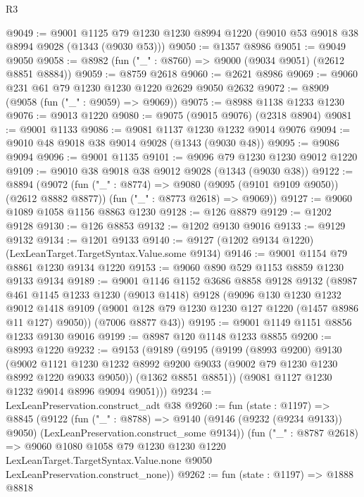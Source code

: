 \begin{lexlean}{R3}
\begin{coremodule}
@9049 := @9001
    @1125
    @79
    @1230
    @1230
    @8994
    @1220
    (@9010 @53 @9018 @38 @8994 @9028 (@1343 (@9030 @53)))
@9050 := @1357 @8986
@9051 := @9049 @9050
@9058 := @8982 (fun ("_" : @8760) => @9000 (@9034 @9051) (@2612 @8851 @8884))
@9059 := @8759 @2618
@9060 := @2621 @8986
@9069 := @9060 @231 @61 @79 @1230 @1230 @1220 @2629 @9050 @2632
@9072 := @8909 (@9058 (fun ("_" : @9059) => @9069))
@9075 := @8988 @1138 @1233 @1230
@9076 := @9013 @1220
@9080 := @9075 (@9015 @9076) (@2318 @8904)
@9081 := @9001 @1133
@9086 := @9081 @1137 @1230 @1232 @9014 @9076
@9094 := @9010 @48 @9018 @38 @9014 @9028 (@1343 (@9030 @48))
@9095 := @9086 @9094
@9096 := @9001 @1135
@9101 := @9096 @79 @1230 @1230 @9012 @1220
@9109 := @9010 @38 @9018 @38 @9012 @9028 (@1343 (@9030 @38))
@9122 := @8894
    (@9072
      (fun ("_" : @8774) => @9080 (@9095 (@9101 @9109 @9050)) (@2612 @8882 @8877))
      (fun ("_" : @8773 @2618) => @9069))
@9127 := @9060 @1089 @1058 @1156 @8863 @1230
@9128 := @126 @8879
@9129 := @1202 @9128
@9130 := @126 @8853
@9132 := @1202 @9130 @9016
@9133 := @9129 @9132
@9134 := @1201 @9133
@9140 := @9127 (@1202 @9134 @1220) (LexLeanTarget.TargetSyntax.Value.some @9134)
@9146 := @9001 @1154 @79 @8861 @1230 @9134 @1220
@9153 := @9060 @890 @529 @1153 @8859 @1230 @9133 @9134
@9189 := @9001
    @1146
    @1152
    @3686
    @8858
    @9128
    @9132
    (@8987
      @461
      @1145
      @1233
      @1230
      (@9013 @1418)
      @9128
      (@9096
        @130
        @1230
        @1232
        @9012
        @1418
        @9109
        (@9001 @128 @79 @1230 @1230 @127 @1220 (@1457 @8986 @11 @127) @9050))
      (@7006 @8877 @43))
@9195 := @9001 @1149 @1151 @8856 @1233 @9130 @9016
@9199 := @8987 @120 @1148 @1233 @8855
@9200 := @8993 @1220
@9232 := @9153
    (@9189
      (@9195
        (@9199
          (@8993 @9200)
          @9130
          (@9002
            @1121
            @1230
            @1232
            @8992
            @9200
            @9033
            (@9002 @79 @1230 @1230 @8992 @1220 @9033 @9050))
          (@1362 @8851 @8851))
        (@9081 @1127 @1230 @1232 @9014 @8996 @9094 @9051)))
@9234 := LexLeanPreservation.construct_adt @38
@9260 := fun (state : @1197) =>
  @8845
    (@9122
      (fun ("_" : @8788) =>
      @9140 (@9146 (@9232 (@9234 @9133)) @9050) (LexLeanPreservation.construct_some @9134))
      (fun ("_" : @8787 @2618) =>
      @9060
        @1080
        @1058
        @79
        @1230
        @1230
        @1220
        LexLeanTarget.TargetSyntax.Value.none
        @9050
        LexLeanPreservation.construct_none))
@9262 := fun (state : @1197) => @1888 @8818

\end{coremodule}
\end{lexlean}
